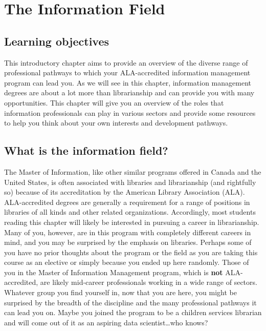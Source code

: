 \documentclass[
  letterpaper,
  DIV=11,
  numbers=noendperiod]{scrreprt}
\begin{document}

\chapter{The Information Field}\label{the-information-field}

\section{Learning objectives}\label{learning-objectives}

This introductory chapter aims to provide an overview of the diverse
range of professional pathways to which your ALA-accredited information
management program can lead you. As we will see in this chapter,
information management degrees are about a lot more than librarianship
and can provide you with many opportunities. This chapter will give you
an overview of the roles that information professionals can play in
various sectors and provide some resources to help you think about your
own interests and development pathways.

\section{What is the information
field?}\label{what-is-the-information-field}

The Master of Information, like other similar programs offered in Canada
and the United States, is often associated with libraries and
librarianship (and rightfully so) because of its accreditation by the
American Library Association (ALA). ALA-accredited degrees are generally
a requirement for a range of positions in libraries of all kinds and
other related organizations. Accordingly, most students reading this
chapter will likely be interested in pursuing a career in librarianship.
Many of you, however, are in this program with completely different
careers in mind, and you may be surprised by the emphasis on libraries.
Perhaps some of you have no prior thoughts about the program or the
field as you are taking this course as an elective or simply because you
ended up here randomly. Those of you in the Master of Information
Management program, which is \textbf{not} ALA-accredited, are likely
mid-career professionals working in a wide range of sectors. Whatever
group you find yourself in, now that you are here, you might be
surprised by the breadth of the discipline and the many professional
pathways it can lead you on. Maybe you joined the program to be a
children services librarian and will come out of it as an aspiring data
scientist\ldots who knows?
\end{document}
